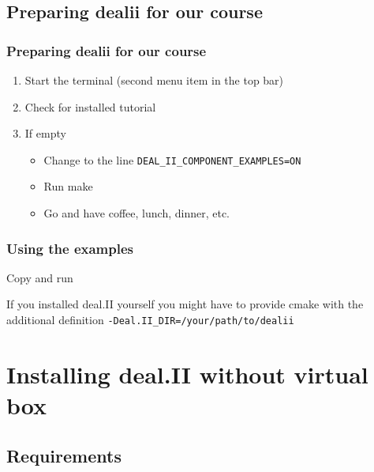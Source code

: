 \subsection{Preparing dealii for our course}
\begin{frame}
  \frametitle{Preparing dealii for our course}
  \begin{enumerate}
  \item Start the terminal (second menu item in the top bar)
  \item Check for installed tutorial
    \begin{block}{}
      
    \end{block}
  \item If empty
    \begin{block}{}
      
    \end{block}
    \begin{itemize}
    \item Change to the line \lstinline{DEAL_II_COMPONENT_EXAMPLES=ON}
    \item Run make
    \item Go and have coffee, lunch, dinner, etc.
    \end{itemize}
  \end{enumerate}
\end{frame}

\begin{frame}
  \frametitle{Using the examples}
    \begin{block}{Copy and run}
      
    \end{block}
    If you installed deal.II yourself you might have to provide cmake with the additional definition \lstinline{-Deal.II_DIR=/your/path/to/dealii}
\end{frame}

\section[Installing]{Installing deal.II without virtual box}
\subsection{Requirements}

